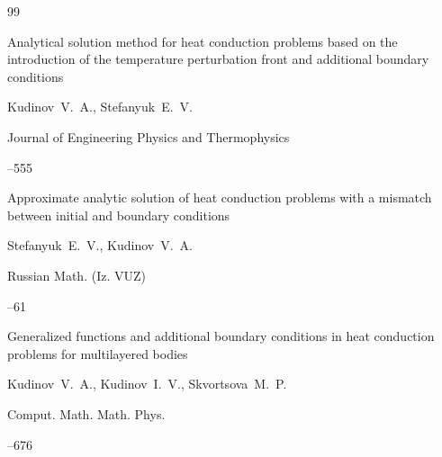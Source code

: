 \begin{thebibliography}{99}




\paper Analytical solution method for heat conduction problems based on the introduction of the temperature perturbation front and additional boundary conditions

\by Kudinov~V.~A., Stefanyuk~E.~V.

\jour Journal of Engineering Physics and Thermophysics




--555





\paper Approximate analytic solution of heat conduction problems with a mismatch between initial and boundary conditions

\by Stefanyuk~E.~V., Kudinov~V.~A.

\jour Russian Math. (Iz. VUZ)




--61






\paper Generalized functions and additional boundary conditions in heat conduction problems for multilayered bodies

\by Kudinov~V.~A., Kudinov~I.~V., Skvortsova~M.~P.

\jour Comput. Math. Math. Phys.




--676




\end{thebibliography}
